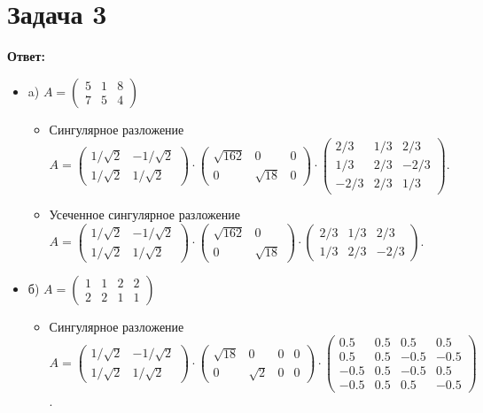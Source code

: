 \documentclass{article}
\begin{document}
\section*{Задача 3}
{\bf Ответ:}
\begin{itemize}
    \item  a) $A=\left(\begin{array}{rrr}5 & 1 & 8\\7 & 5 & 4\end{array}\right)$
    \begin{itemize}
        \item Сингулярное разложение $A=\left(\begin{array}{rr}1/\sqrt{2} & -1/\sqrt{2}\\1/\sqrt{2} & 1/\sqrt{2}\end{array}\right)\cdot\left(\begin{array}{rrr}\sqrt{162} & 0 & 0\\0 & \sqrt{18} & 0\end{array}\right)\cdot\left(\begin{array}{rrr}2/3 & 1/3 & 2/3\\1/3 & 2/3 & -2/3\\-2/3 & 2/3 & 1/3\end{array}\right)$.
        \item Усеченное сингулярное разложение $A=\left(\begin{array}{rr}1/\sqrt{2} & -1/\sqrt{2}\\1/\sqrt{2} & 1/\sqrt{2}\end{array}\right)\cdot\left(\begin{array}{rr}\sqrt{162} & 0\\0 & \sqrt{18}\end{array}\right)\cdot\left(\begin{array}{rrr}2/3 & 1/3 & 2/3\\1/3 & 2/3 & -2/3\end{array}\right)$.
    \end{itemize}
    \item б) $A=\left(\begin{array}{rrrr}1 & 1 & 2 & 2\\2 & 2 & 1 & 1\end{array}\right)$
    \begin{itemize}
        \item Сингулярное разложение $A=\left(\begin{array}{rr}1/\sqrt{2} & -1/\sqrt{2}\\1/\sqrt{2} & 1/\sqrt{2}\end{array}\right)\cdot\left(\begin{array}{rrrr}\sqrt{18} & 0 & 0 & 0\\0 & \sqrt{2} & 0 & 0\end{array}\right)\cdot\left(\begin{array}{rrrr}0.5 & 0.5 & 0.5 & 0.5\\0.5 & 0.5 & -0.5 & -0.5\\-0.5 & 0.5 & -0.5 & 0.5\\-0.5 & 0.5 & 0.5 & -0.5\end{array}\right)$.

\end{itemize}
\end{itemize}
\end{document}
